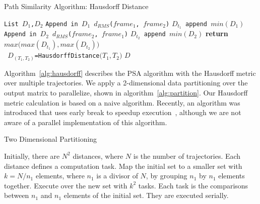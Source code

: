 \begin{algorithm}[ht]
    \scriptsize
    \caption{Path Similarity Algorithm: Hausdorff Distance}
    \label{alg:hausdorff}
    \begin{algorithmic}[1]
        \State \texttt{List $D_1$,$D_2$}
        \State \texttt{Append in $D_1$ $d_{RMS}$($frame_1$, $frame_2$)}
        \EndFor
        \State \texttt{$D_{t_1}$ append $min(D_1)$}
        \EndFor
        \State \texttt{Append in $D_2$ $d_{RMS}$($frame_2$, $frame_1$)}
        \EndFor
        \State\texttt{$D_{t_2}$ append $min(D_2)$}
        \EndFor
        \State \textbf{return} $max\Big(max(D_{t_1}),max(D_{t_2})\Big)$
        \EndProcedure
        \\        
        \State \texttt{ $D_{( T_1,T_2 )}$=HausdorffDistance$\Big( T_1,T_2 \Big)$} 
        \EndFor
        \EndFor
        \State \Return $D$
        \EndProcedure
    \end{algorithmic}
\end{algorithm}

Algorithm~\ref{alg:hausdorff} describes the PSA algorithm with the Hausdorff metric over multiple trajectories.
We apply a 2-dimensional data partitioning over the output matrix to parallelize, shown in algorithm~\ref{alg:partition}.
Our Hausdorff metric calculation is based on a naive algorithm.
Recently, an algorithm was introduced that uses early break to speedup execution~\cite{taha2015efficient}, although we are not aware of a parallel implementation of this algorithm.

\begin{algorithm}[ht]
    \scriptsize
    \caption{Two Dimensional Partitioning}
    \label{alg:partition}
    \begin{algorithmic}[1]
        \State Initially, there are $N^2$ distances, where $N$ is the number of trajectories.
        Each distance defines a computation task.
        \State Map the initial set to a smaller set with $k=N/n_1$ elements, where $n_1$ is a divisor of $N$, by grouping $n_1$ by $n_1$ elements together.
        \State Execute over the new set with $k^2$ tasks.
        Each task is the comparisons between $n_1$ and $n_1$  elements of the initial set.
        They are executed serially.
    \end{algorithmic}
\end{algorithm}

